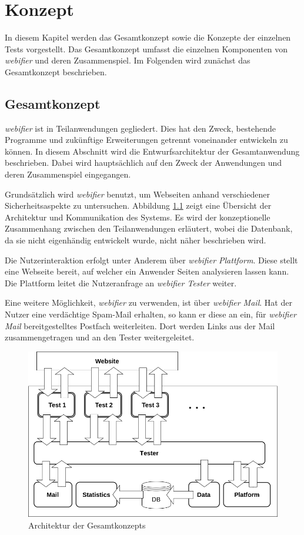 \chapter{Konzept}

In diesem Kapitel werden das Gesamtkonzept sowie die Konzepte der einzelnen Tests vorgestellt. Das
Gesamtkonzept umfasst die einzelnen Komponenten von \textit{webifier} und deren Zusammenspiel. Im
Folgenden wird zunächst das Gesamtkonzept beschrieben.

\section{Gesamtkonzept}

\textit{webifier} ist in Teilanwendungen gegliedert.
Dies hat den Zweck, bestehende Programme und zukünftige Erweiterungen getrennt
voneinander entwickeln zu können. In diesem Abschnitt wird die Entwurfsarchitektur der
Gesamtanwendung beschrieben. Dabei wird hauptsächlich auf den Zweck der Anwendungen und deren
Zusammenspiel eingegangen.

Grundsätzlich wird \textit{webifier} benutzt, um Webseiten anhand verschiedener Sicherheitsaspekte
zu untersuchen.
Abbildung \ref{fig:anwendung-konzept} zeigt eine Übersicht der Architektur und
Kommunikation des Systems.
Es wird der konzeptionelle Zusammenhang zwischen den Teilanwendungen erläutert, wobei die
Datenbank, da sie nicht eigenhändig entwickelt wurde, nicht näher beschrieben
wird.

Die Nutzerinteraktion erfolgt unter Anderem über \textit{webifier Plattform}. Diese stellt eine
Webseite bereit, auf welcher ein Anwender Seiten analysieren lassen kann. Die Plattform leitet die
Nutzeranfrage an \textit{webifier Tester} weiter.

Eine weitere Möglichkeit, \textit{webifier} zu verwenden, ist über \textit{webifier Mail}.
Hat der Nutzer eine verdächtige Spam-Mail erhalten, so kann er diese an ein, für \textit{webifier
Mail} bereitgestelltes Postfach weiterleiten.
Dort werden Links aus der Mail zusammengetragen und an den Tester weitergeleitet.

\begin{figure}[H]
	\centering
	\includegraphics[width=14cm]{images/anwendung-konzept}
	\caption{Architektur der Gesamtkonzepts}
	\label{fig:anwendung-konzept}
\end{figure}

